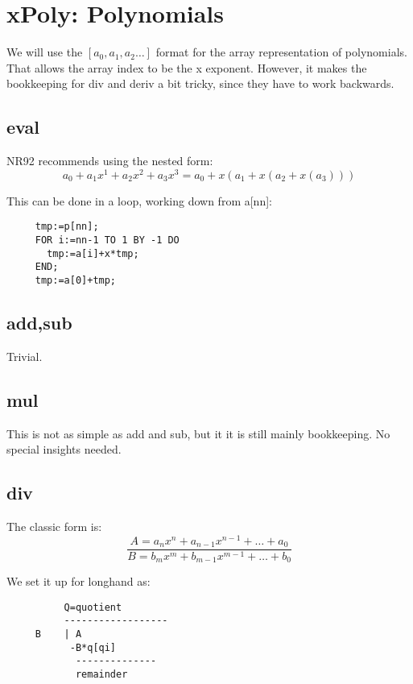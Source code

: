 \section{xPoly: Polynomials}
We will use the $[a_0,a_1,a_2 \dots]$ format for the array
representation of polynomials.  That allows the array index
to be the x exponent.  However, it makes the bookkeeping for
div and deriv a bit tricky, since they have to work
backwards.

\subsection*{eval}
NR92 recommends using the nested form:
\begin{equation}
    a_0 + a_1 x^1 + a_2 x^2 + a_3 x^3
      = a_0+ x(a_1+x(a_2+x(a_3)))
\end{equation}

This can be done in a loop, working down from a[nn]:
\begin{tt} \begin{verbatim}
     tmp:=p[nn];
     FOR i:=nn-1 TO 1 BY -1 DO
       tmp:=a[i]+x*tmp;
     END;
     tmp:=a[0]+tmp;
\end{verbatim}  \end{tt}
   
\subsection*{add,sub}
Trivial.

\subsection*{mul}
This is not as simple as add and sub, but it it is still
mainly bookkeeping.  No special insights needed.

\subsection*{div}
The classic form is:
\begin{equation}
   \frac{A=a_n x^n+a_{n-1} x^{n-1}+\dots+a_0}
     {B=b_m x^m+b_{m-1} x^{m-1}+\dots+b_0}
\end{equation}

We set it up for longhand as:
\begin{tt} \begin{verbatim}
          Q=quotient
          ------------------
     B    | A
           -B*q[qi]
            --------------
            remainder
\end{verbatim} \end{tt}

